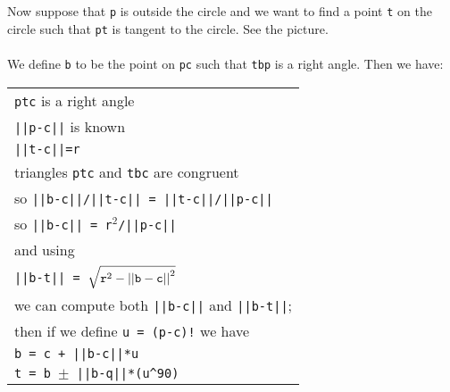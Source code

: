 \documentclass[12pt]{article}
\begin{document}
\begin{minipage}{\textwidth}\raggedright
\label{TANGENT-PICTURE}
\begin{wrapfigure}{r}{0.3\textwidth}
\end{wrapfigure}
Now suppose that {\tt p} is outside the circle and we want to find
a point {\tt t} on the circle such that {\tt pt} is tangent to the
circle.  See the picture. \\
~ \\
\label{FINDING-TANGENT-POINT}
We define {\tt b} to be the point on {\tt pc} such that
{\tt tbp} is a right angle.  Then we have: \\
\hspace*{0.2in}\begin{tabular}{@{}l} \\
    {\tt ptc} is a right angle \\
    {\tt ||p-c||} is known \\
    {\tt ||t-c||=r} \\
    triangles {\tt ptc} and {\tt tbc} are congruent \\
    so {\tt \small ||b-c||/||t-c|| = ||t-c||/||p-c||} \\
    so {\tt \small ||b-c|| = r$^2$/||p-c||} \\
    and using \\
    {\tt ||b-t|| = $\sqrt{{\tt r}^2 - {\tt ||b-c||}^2}$} \\
    we can compute both {\tt ||b-c||} and {\tt ||b-t||}; \\
    then if we define {\tt u = (p-c)!} we have \\
    {\tt b = c + ||b-c||*u} \\
    {\tt t = b $\pm$ ||b-q||*(u\textasciicircum 90)} \\
    \end{tabular}
\end{minipage}
\end{document}
